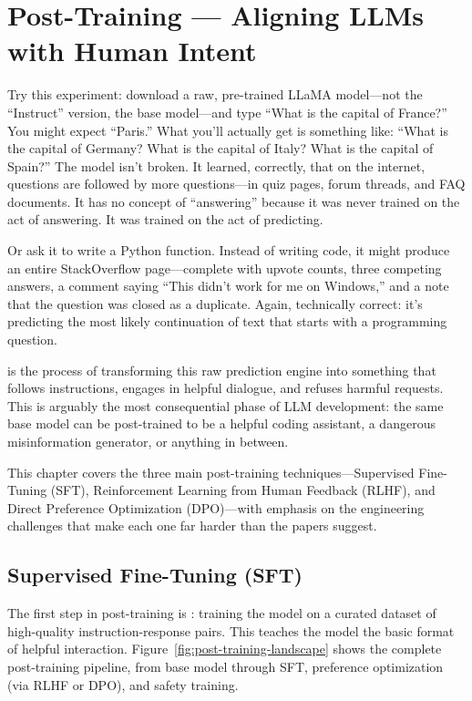 \chapter{Post-Training --- Aligning LLMs with Human Intent}
\label{ch:post-training}

\noindent
Try this experiment: download a raw, pre-trained LLaMA model---not the ``Instruct'' version, the base model---and type ``What is the capital of France?'' You might expect ``Paris.'' What you'll actually get is something like: ``What is the capital of Germany? What is the capital of Italy? What is the capital of Spain?'' The model isn't broken. It learned, correctly, that on the internet, questions are followed by more questions---in quiz pages, forum threads, and FAQ documents. It has no concept of ``answering'' because it was never trained on the act of answering. It was trained on the act of predicting.

Or ask it to write a Python function. Instead of writing code, it might produce an entire StackOverflow page---complete with upvote counts, three competing answers, a comment saying ``This didn't work for me on Windows,'' and a note that the question was closed as a duplicate. Again, technically correct: it's predicting the most likely continuation of text that starts with a programming question. 

 is the process of transforming this raw prediction engine into something that follows instructions, engages in helpful dialogue, and refuses harmful requests. This is arguably the most consequential phase of LLM development: the same base model can be post-trained to be a helpful coding assistant, a dangerous misinformation generator, or anything in between.

This chapter covers the three main post-training techniques---Supervised Fine-Tuning (SFT), Reinforcement Learning from Human Feedback (RLHF), and Direct Preference Optimization (DPO)---with emphasis on the engineering challenges that make each one far harder than the papers suggest.


\section{Supervised Fine-Tuning (SFT)}
\label{sec:sft}

The first step in post-training is : training the model on a curated dataset of high-quality instruction-response pairs. This teaches the model the basic format of helpful interaction. Figure~\ref{fig:post-training-landscape} shows the complete post-training pipeline, from base model through SFT, preference optimization (via RLHF or DPO), and safety training.

